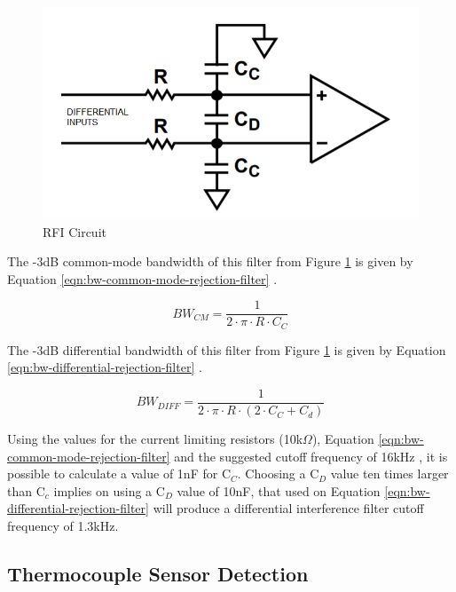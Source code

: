 		\begin{figure}[htbp]
			\centering
				\includegraphics[scale=1.1]{figuras/fig-rfi-standard-filter}
			\caption{RFI Circuit \cite{rfi-standard-filter}}
			\label{fig:rfi-standard-filter}
		\end{figure}

	The -3dB common-mode bandwidth of this filter from Figure \ref{fig:rfi-standard-filter} is given by Equation \ref{eqn:bw-common-mode-rejection-filter} \cite{analogDevDesignersGuide}.

		\begin{equation}\label{eqn:bw-common-mode-rejection-filter}
			BW_{CM}=\frac{1}{2 \cdot \pi \cdot R \cdot C_{C}}
		\end{equation}
	
	The -3dB differential bandwidth of this filter from Figure \ref{fig:rfi-standard-filter} is given by Equation \ref{eqn:bw-differential-rejection-filter} \cite{analogDevDesignersGuide}.
	
		\begin{equation}\label{eqn:bw-differential-rejection-filter}
			BW_{DIFF}=\frac{1}{2 \cdot \pi \cdot R \cdot \left( 2 \cdot C_{C} + C_{d} \right)}
		\end{equation}
		
	Using the values for the current limiting resistors (10k$\Omega$), Equation \ref{eqn:bw-common-mode-rejection-filter} and the suggested cutoff frequency of 16kHz \cite{two-ways-thermocouple}, it is possible to calculate a value of 1nF for C$_{C}$. Choosing a C$_{D}$ value ten times larger than C$_{c}$ implies on using a C$_{D}$ value of 10nF, that used on Equation \ref{eqn:bw-differential-rejection-filter} will produce a differential interference filter cutoff frequency of 1.3kHz.
		
	\subsection{Thermocouple Sensor Detection}\label{ssec:thermocouple-sensor-detection}
		
